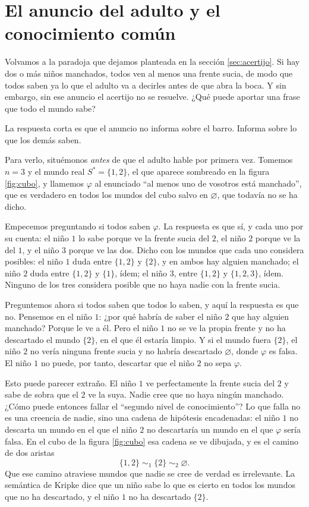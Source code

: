 \section{El anuncio del adulto y el conocimiento común}\label{sec:comun}

Volvamos a la paradoja que dejamos planteada en la sección \ref{sec:acertijo}. Si hay dos o más niños manchados, todos ven al menos una frente sucia, de modo que todos saben ya lo que el adulto va a decirles antes de que abra la boca. Y sin embargo, sin ese anuncio el acertijo no se resuelve. ¿Qué puede aportar una frase que todo el mundo sabe?

La respuesta corta es que el anuncio no informa sobre el barro. Informa sobre lo que los demás saben.

Para verlo, situémonos \emph{antes} de que el adulto hable por primera vez. Tomemos $n=3$ y el mundo real $S^{*}=\{1,2\}$, el que aparece sombreado en la figura \ref{fig:cubo}, y llamemos $\varphi$ al enunciado ``al menos uno de vosotros está manchado'', que es verdadero en todos los mundos del cubo salvo en $\varnothing$, que todavía no se ha dicho.

Empecemos preguntando si todos saben $\varphi$. La respuesta es que sí, y cada uno por su cuenta: el niño $1$ lo sabe porque ve la frente sucia del $2$, el niño $2$ porque ve la del $1$, y el niño $3$ porque ve las dos. Dicho con los mundos que cada uno considera posibles: el niño $1$ duda entre $\{1,2\}$ y $\{2\}$, y en ambos hay alguien manchado; el niño $2$ duda entre $\{1,2\}$ y $\{1\}$, ídem; el niño $3$, entre $\{1,2\}$ y $\{1,2,3\}$, ídem. Ninguno de los tres considera posible que no haya nadie con la frente sucia.

Preguntemos ahora si todos saben que todos lo saben, y aquí la respuesta es que no. Pensemos en el niño $1$: ¿por qué habría de saber el niño $2$ que hay alguien manchado? Porque le ve a él. Pero el niño $1$ no se ve la propia frente y no ha descartado el mundo $\{2\}$, en el que él estaría limpio. Y si el mundo fuera $\{2\}$, el niño $2$ no vería ninguna frente sucia y no habría descartado $\varnothing$, donde $\varphi$ es falsa. El niño $1$ no puede, por tanto, descartar que el niño $2$ no sepa $\varphi$.

Esto puede parecer extraño. El niño $1$ ve perfectamente la frente sucia del $2$ y sabe de sobra que el $2$ ve la suya. Nadie cree que no haya ningún manchado. ¿Cómo puede entonces fallar el ``segundo nivel de conocimiento''? Lo que falla no es una creencia de nadie, sino una cadena de hipótesis encadenadas: el niño $1$ no descarta un mundo en el que el niño $2$ no descartaría un mundo en el que $\varphi$ sería falsa. En el cubo de la figura \ref{fig:cubo} esa cadena se ve dibujada, y es el camino de dos aristas
\[
  \{1,2\} \;\sim_1\; \{2\} \;\sim_2\; \varnothing.
\]
Que ese camino atraviese mundos que nadie se cree de verdad es irrelevante. La semántica de Kripke dice que un niño sabe lo que es cierto en todos los mundos que no ha descartado, y el niño $1$ no ha descartado $\{2\}$.

